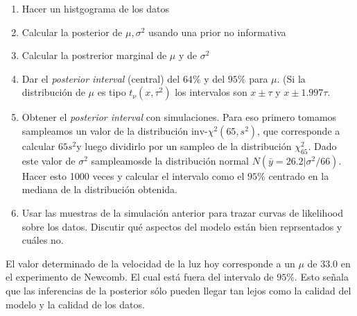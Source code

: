\documentclass[12pt]{paper}
\begin{document}
\begin{enumerate}
\item Hacer un histgograma de los datos
\item Calcular la posterior de $\mu,\sigma^{2}$ usando una prior no informativa
\item Calcular la postrerior marginal de $\mu$ y de $\sigma^{2}$
\item Dar el \textit{posterior interval} (central) del $64 \%$ y del $95\%$ para $\mu$. (Si la distribución de $\mu$ es tipo $t_{\nu}(x,\tau^{2})$ los intervalos son $ x \pm \tau$ y $x \pm 1.997 \tau$.
\item Obtener el \textit{posterior interval} con simulaciones. Para eso primero tomamos sampleamos un valor de la distribución $\text{inv-}\chi^{2}(65,s^{2})$, que corresponde a calcular $65s^{2}$y luego dividirlo por un sampleo de la distribución $\chi^{2}_{65}$. Dado este valor de $\sigma^{2}$ sampleamosde la distribución normal $N(\bar{y} = 26.2|\sigma^{2}/66)$. Hacer esto 1000 veces y calcular el intervalo como el $95 \%$ centrado en la mediana de la distribución obtenida.

\item Usar las muestras de la simulación anterior para trazar  curvas de likelihood sobre los datos. Discutir qué aspectos del modelo están bien reprsentados y cuáles no.

\end{enumerate}

El valor determinado de la velocidad de la luz hoy corresponde a un $\mu$ de $33.0$ en el experimento de Newcomb. El cual está fuera del intervalo de $95\%$. Esto señala que las inferencias de la posterior sólo pueden llegar tan lejos como la calidad del modelo y la calidad de los datos.
\pagestyle{empty}
\end{document}
